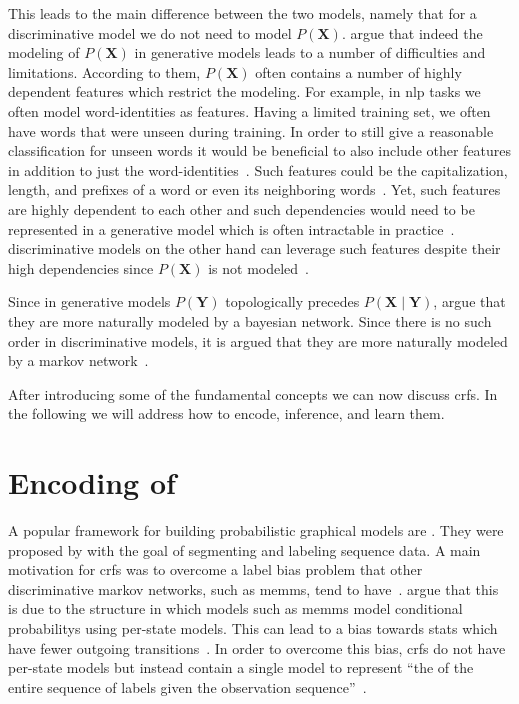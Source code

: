 This leads to the main difference between the two models, namely that for a \gls{discriminative model} we do not need to model $P(\bm{X})$.
\citet{sutton2010introduction} argue that indeed the modeling of $P(\bm{X})$ in \glspl{generative model} leads to a number of difficulties and limitations.
According to them, $P(\bm{X})$ often contains a number of highly dependent features which restrict the modeling.
For example, in \gls{nlp} tasks we often model word-identities as features.
Having a limited training set, we often have words that were unseen during training.
In order to still give a reasonable classification for unseen words it would be beneficial to also include other features in addition to just the word-identities~\citep{sutton2010introduction}.
Such features could be the capitalization, length, and prefixes of a word or even its neighboring words~\citep{sutton2010introduction}.
Yet, such features are highly dependent to each other and such dependencies would need to be represented in a \gls{generative model} which is often intractable in practice~\citep{sutton2010introduction}.
\Glspl{discriminative model} on the other hand can leverage such features despite their high dependencies since $P(\bm{X})$ is not modeled~\citep{koller2009probabilistic}.

Since in \glspl{generative model} $P(\bm{Y})$ topologically precedes $P(\bm{X}\mid\bm{Y})$, \citet{sutton2010introduction} argue that they are more naturally modeled by a \gls{bayesian network}.
Since there is no such order in \glspl{discriminative model}, it is argued that they are more naturally modeled by a \gls{markov network}~\citep{sutton2010introduction}.

\bigskip

After introducing some of the fundamental concepts we can now discuss \glspl{crf}. In the following we will address how to encode, inference, and learn them.

\section{Encoding of }\label{sec:definition-crfs}
A popular framework for building \glspl{probabilistic graphical model} are .
They were proposed by \citet{lafferty2001conditional} with the goal of segmenting and labeling sequence data.
A main motivation for \glspl{crf} was to overcome a label bias problem that other discriminative \glspl{markov network}, such as \glspl{memm}, tend to have~\citep{lafferty2001conditional}.
\citet{lafferty2001conditional} argue that this is due to the structure in which models such as \glspl{memm} model \glspl{conditional probability} using per-state models.
This can lead to a bias towards stats which have fewer outgoing transitions~\citep{lafferty2001conditional}.
In order to overcome this bias, \glspl{crf} do not have per-state models but instead contain a single model to represent ``the  of the entire sequence of labels given the observation sequence''~\citep{lafferty2001conditional}.

